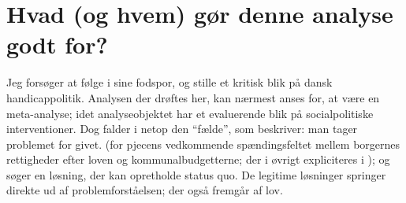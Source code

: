\section{Hvad (og hvem) gør denne analyse godt for?}
Jeg forsøger at følge i  sine fodspor, og stille et kritisk blik på dansk handicappolitik.
Analysen der drøftes her, kan nærmest anses for, at være en meta-analyse; idet analyseobjektet har et evaluerende blik på socialpolitiske interventioner.
Dog falder  i netop den “fælde”, som \citeauthor{scheurichPolicyArchaeologyNew1994} beskriver: man tager problemet for givet. (for pjecens vedkommende spændingsfeltet mellem borgernes rettigheder efter loven og kommunalbudgetterne; der i øvrigt expliciteres i ); og søger en løsning, der kan opretholde status quo.
De legitime løsninger springer direkte ud af problemforståelsen; der også fremgår af lov.
